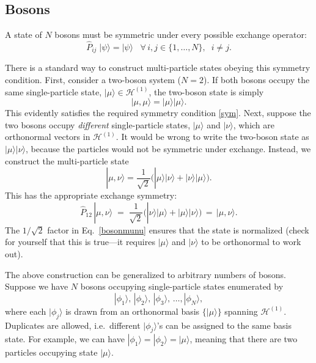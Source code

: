 \documentclass[pra,12pt]{revtex4-2}
\begin{document}
\subsection{Bosons}
\label{sec:bosons}

A state of $N$ bosons must be symmetric under every possible exchange
operator:
\begin{equation}
  \hat{P}_{ij}\; |\psi\rangle = |\psi\rangle \;\;\; \forall\, i, j \in\{1,\dots,N\},\;\; i\ne j.
  \label{sym}
\end{equation}

There is a standard way to construct multi-particle states obeying
this symmetry condition.  First, consider a two-boson system ($N =
2$).  If both bosons occupy the same single-particle state,
$|\mu\rangle \in \mathscr{H}^{(1)}$, the two-boson state is simply
\begin{equation}
  |\mu,\mu\rangle = |\mu\rangle  |\mu\rangle.
\end{equation}
This evidently satisfies the required symmetry condition \eqref{sym}.
Next, suppose the two bosons occupy \textit{different} single-particle
states, $|\mu\rangle$ and $|\nu\rangle$, which are orthonormal vectors
in $\mathscr{H}^{(1)}$.  It would be wrong to write the two-boson
state as $|\mu\rangle |\nu\rangle$, because the particles would not be
symmetric under exchange.  Instead, we construct the multi-particle
state
\begin{equation}
  |\mu,\nu\rangle = \frac{1}{\sqrt{2}} \Big( |\mu\rangle |\nu\rangle +
  |\nu\rangle |\mu\rangle\Big).
  \label{bosonmunu}
\end{equation}
This has the appropriate exchange symmetry:
\begin{equation}
  \hat{P}_{12}\,|\mu,\nu\rangle \;=\; \frac{1}{\sqrt{2}}
  \Big( |\nu\rangle  |\mu\rangle + |\mu\rangle  |\nu\rangle\Big)
  \,=\, |\mu, \nu\rangle.
\end{equation}
The $1/\sqrt{2}$ factor in Eq.~\eqref{bosonmunu} ensures that the
state is normalized (check for yourself that this is true---it
requires $|\mu\rangle$ and $|\nu\rangle$ to be orthonormal to work
out).

The above construction can be generalized to arbitrary numbers of
bosons.  Suppose we have $N$ bosons occupying single-particle states
enumerated by
\begin{equation}
  |\phi_1\rangle, \, |\phi_2\rangle, \, |\phi_3\rangle, \, \dots, |\phi_N\rangle,
\end{equation}
where each $|\phi_j\rangle$ is drawn from an orthonormal basis
$\{|\mu\rangle\}$ spanning $\mathscr{H}^{(1)}$.  Duplicates are
allowed, i.e.~different $|\phi_j\rangle$'s can be assigned to the same
basis state.  For example, we can have $|\phi_1\rangle =
|\phi_2\rangle = |\mu\rangle$, meaning that there are two particles
occupying state $|\mu\rangle$.
\end{document}
